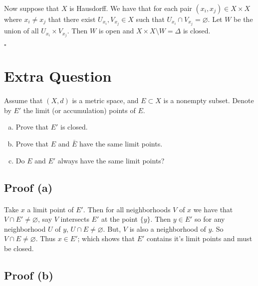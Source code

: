 \documentclass[11pt, oneside]{article}   	%
\newcommand{\qed}{\begin{center}
$\square$
\end{center}}
\begin{document}
Now suppose that $X$ is Hausdorff. We have that for each pair $(x_i, x_j) \in X \times X$ where $x_i \neq x_j$ that there exist $U_{x_i}, V_{x_j} \in X$ such that $U_{x_i} \cap V_{x_j} = \varnothing$. Let $W$ be the union of all $U_{x_i} \times V_{x_j}$. Then $W$ is open and $X \times X \setminus W = \Delta$ is closed. \qed



\section*{Extra Question}
\paragraph{}

Assume that $(X,d)$ is a metric space, and $E \subset X$ is a nonempty subset. Denote by $E'$ the limit (or accumulation) points of $E$.

\begin{enumerate}[(a)]

\item
Prove that $E'$ is closed.
\item
Prove that $E$ and $\bar{E}$ have the same limit points.
\item
Do $E$ and $E'$ always have the same limit points?

\end{enumerate}


\subsection*{Proof (a)}
\paragraph{}

Take $x$ a limit point of $E'$. Then for all neighborhoods $V$ of $x$ we have that $V \cap E' \neq \varnothing$, say $V$ intersects $E'$ at the point $\{y\}$. Then $y \in E'$ so for any neighborhood $U$ of $y$, $U \cap E \neq \varnothing$. But, $V$ is also a neighborhood of $y$. So $V \cap E \neq \varnothing$. Thus $x \in E'$; which shows that $E'$ contains it's limit points and must be closed.

\subsection*{Proof (b)}
\paragraph{}
\end{document}
